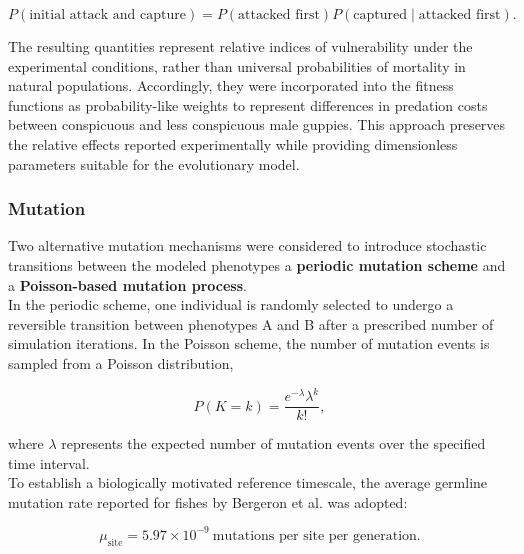 \begin{equation}
    P(\text{initial attack and capture})=
P(\text{attacked first})
P(\text{captured}\mid\text{attacked first}).
    \label{eq:D}
\end{equation}


The resulting quantities represent relative indices of vulnerability under the experimental conditions, rather than universal probabilities of mortality in natural populations. Accordingly, they were incorporated into the fitness functions as probability-like weights to represent differences in predation costs between conspicuous and less conspicuous male guppies. This approach preserves the relative effects reported experimentally while providing dimensionless parameters suitable for the evolutionary model. \\ 



\subsubsection*{Mutation}

Two alternative mutation mechanisms were considered to introduce stochastic transitions between the modeled phenotypes a \textbf{periodic mutation scheme} and a \textbf{Poisson-based mutation process}. \\ 

In the periodic scheme, one individual is randomly selected to undergo a reversible transition between phenotypes A and B after a prescribed number of simulation iterations. In the Poisson scheme, the number of mutation events is sampled from a Poisson distribution,

\begin{equation}
    P(K=k)=\frac{e^{-\lambda}\lambda^k}{k!},
    \label{eq:poisson}
\end{equation}

where $\lambda$ represents the expected number of mutation events over the specified time interval. \\ 

To establish a biologically motivated reference timescale, the average germline mutation rate reported for fishes by Bergeron et al. \cite{bergeronEvolutionGermlineMutation2023} was adopted:

\begin{equation}
    \mu_{\mathrm{site}}
    =5.97\times10^{-9}
    \ \text{mutations per site per generation}.
\end{equation}

